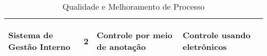 \begin{table}[H]
\begin{tabular}{| m{4cm} | m{4cm} | m{4cm} | m{4cm} |}
        \begin{center} \textbf{Sistema de Gestão Interno} \end{center}  & \begin{center} 2 \end{center}  & \begin{center} Controle por meio de anotação \end{center} & \begin{center} Controle usando eletrônicos \end{center}    \\ \hline
      \end{tabular}
      \caption{Qualidade e Melhoramento de Processo}
      \label{tabela:melhoramento}
  \end{table}